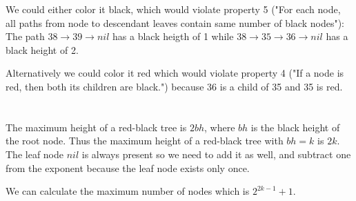 \documentclass[12pt, a4paper]{article}
\begin{document}
We could either color it black, which would violate property 5 ("For each node, all paths from node to descendant leaves contain same number of black nodes"): The path $38 \rightarrow 39 \rightarrow nil$ has a black heigth of 1 while $38 \rightarrow 35 \rightarrow 36 \rightarrow nil$ has a black height of 2.

Alternatively we could color it red which would violate property 4 ("If a node is red, then both its children are black.") because 36 is a child of 35 and 35 is red.

\section{} %

The maximum height of a red-black tree is $2bh$, where $bh$ is the black height of the root node. Thus the maximum height of a red-black tree with $bh = k$ is $2k$. The leaf node $nil$ is always present so we need to add it as well, and subtract one from the exponent because the leaf node exists only once.

We can calculate the maximum number of nodes which is $2^{2k - 1} + 1$.

\section{} %
\end{document}
